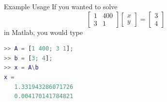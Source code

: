 \documentclass[10pt]{beamer}
\begin{document}
\begin{frame}[fragile]{Example Usage}
If you wanted to solve 
$$
\begin{bmatrix}
    1 & 400\\
    3 & 1 
\end{bmatrix} \begin{bmatrix}
    x\\y
\end{bmatrix} = 
\begin{bmatrix}
    3\\4
\end{bmatrix}
$$
in Matlab, you would type
\begin{lstlisting}[language=matlab]
>> A = [1 400; 3 1];
>> b = [3; 4];
>> x = A\b
x =
   1.331943286071726
   0.004170141784821
\end{lstlisting}
\end{frame}
\end{document}
